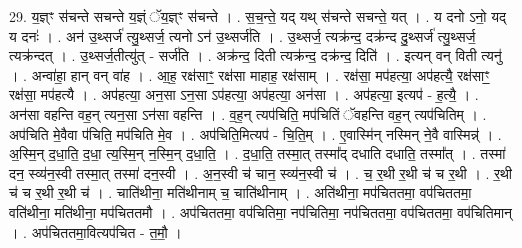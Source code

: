 \documentclass[17pt]{extarticle}
\begin{document}
29. य॒ज्ञ्ꣳ स॑चन्ते सचन्ते य॒ज्ञ्ं ॅय॒ज्ञ्ꣳ स॑चन्ते । . स॒च॒न्ते॒ यद् यथ् स॑चन्ते सचन्ते॒ यत् । . य दनो ऽनो॒ यद् य दनः॑ । . अन॑ उ॒थ्सर्ज॑ त्यु॒थ्सर्ज॒ त्यनो ऽन॑ उ॒थ्सर्ज॑ति । . उ॒थ्सर्ज॒ त्यक्र॑न्द॒ दक्र॑न्द दु॒थ्सर्ज॑ त्यु॒थ्सर्ज॒ त्यक्र॑न्दत् । . उ॒थ्सर्ज॒तीत्यु॑त् - सर्ज॑ति । . अक्र॑न्द॒ दिती त्यक्र॑न्द॒ दक्र॑न्द॒ दिति॑ । . इत्यन् वन् विती त्यनु॑ । . अन्वा॑हा॒ हान् वन् वा॑ह । . आ॒ह॒ रक्ष॑साꣳ॒॒ रक्ष॑सा माहाह॒ रक्ष॑साम् । . रक्ष॑सा॒ मप॑हत्या॒ अप॑हत्यै॒ रक्ष॑साꣳ॒॒ रक्ष॑सा॒ मप॑हत्यै । . अप॑हत्या॒ अन॒सा ऽन॒सा ऽप॑हत्या॒ अप॑हत्या॒ अन॑सा । . अप॑हत्या॒ इत्यप॑ - ह॒त्यै॒ । . अन॑सा वहन्ति वह॒न् त्यन॒सा ऽन॑सा वहन्ति । . व॒ह॒न् त्यप॑चिति॒ मप॑चितिं ॅवहन्ति वह॒न् त्यप॑चितिम् । . अप॑चिति मे॒वैवा प॑चिति॒ मप॑चिति मे॒व । . अप॑चिति॒मित्यप॑ - चि॒ति॒म् । . ए॒वास्मि॑न् नस्मिन् ने॒वै वास्मिन्न्॑ । . अ॒स्मि॒न् द॒धा॒ति॒ द॒धा॒ त्य॒स्मि॒न् न॒स्मि॒न् द॒धा॒ति॒ । . द॒धा॒ति॒ तस्मा॒त् तस्मा᳚द् दधाति दधाति॒ तस्मा᳚त् । . तस्मा॑ दन॒ स्व्य॑न॒स्वी तस्मा॒त् तस्मा॑ दन॒स्वी । . अ॒न॒स्वी च॑ चान॒ स्व्य॑न॒स्वी च॑ । . च॒ र॒थी र॒थी च॑ च र॒थी । . र॒थी च॑ च र॒थी र॒थी च॑ । . चाति॑थीना॒ मति॑थीनाम् च॒ चाति॑थीनाम् । . अति॑थीना॒ मप॑चिततमा॒ वप॑चिततमा॒ वति॑थीना॒ मति॑थीना॒ मप॑चिततमौ । . अप॑चिततमा॒ वप॑चितिमा॒ नप॑चितिमा॒ नप॑चिततमा॒ वप॑चिततमा॒ वप॑चितिमान् । . अप॑चिततमा॒वित्यप॑चित - त॒मौ॒ । \newline
\end{document}
